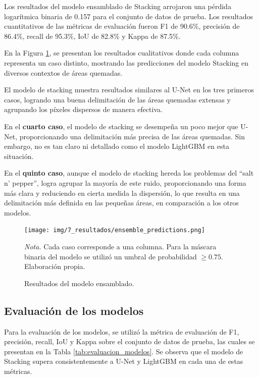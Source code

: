 Los resultados del modelo ensamblado de Stacking arrojaron una pérdida logarítmica binaria de 0.157 para el conjunto de datos de prueba. Los resultados cuantitativos de las 
métricas de evaluación fueron F1 de 90.6\%, precisión de 86.4\%, recall de 95.3\%, IoU de 82.8\% y Kappa de 87.5\%.

En la Figura \ref{fig:ensemble_resultados}, se presentan los resultados cualitativos donde cada columna representa un caso distinto, mostrando las predicciones del modelo 
Stacking en diversos contextos de áreas quemadas.

El modelo de stacking muestra resultados similares al U-Net en los tres primeros casos, logrando una buena delimitación de las áreas quemadas extensas y agrupando los 
píxeles dispersos de manera efectiva.

En el \textbf{cuarto caso}, el modelo de stacking se desempeña un poco mejor que U-Net, proporcionando una delimitación más precisa de las áreas quemadas. Sin embargo, 
no es tan claro ni detallado como el modelo LightGBM en esta situación.

En el \textbf{quinto caso}, aunque el modelo de stacking hereda los problemas del ``salt n' pepper'', logra agrupar la mayoría de este ruido, proporcionando una forma más 
clara y reduciendo en cierta medida la dispersión, lo que resulta en una delimitación más definida en las pequeñas áreas, en comparación a los otros modelos.

\begin{figure}[H]
    \centering
    \caption{Resultados del modelo ensamblado.}
    \label{fig:ensemble_resultados}
    \texttt{[image: img/7\_resultados/ensemble\_predictions.png]}
    \begin{flushleft}
        \vspace{-\baselineskip}
        \textit{Nota.} Cada caso corresponde a una columna. Para la máscara binaria del modelo se utilizó un umbral de probabilidad $\geq 0.75$. Elaboración propia.
        \vspace{-\baselineskip}
    \end{flushleft}
\end{figure}

\subsection{Evaluación de los modelos}
Para la evaluación de los modelos, se utilizó la métrica de evaluación de F1, precisión, recall, IoU y Kappa sobre el conjunto de datos de
prueba, las cuales se presentan en la Tabla \ref{tab:evaluacion_modelos}. Se observa que el modelo de Stacking supera consistentemente a U-Net y LightGBM en cada una de 
estas métricas.

